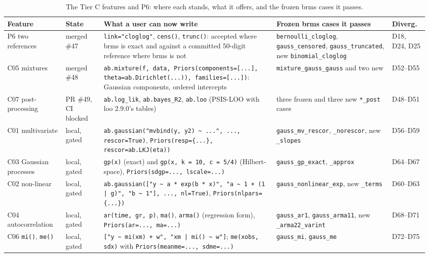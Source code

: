 \documentclass[11pt]{article}
\newcommand{\code}[1]{\texttt{#1}}
\begin{document}
\begin{table}[tbp]
\small
\begin{center}\begin{tabular}{@{}>{\raggedright\arraybackslash}p{}>{\raggedright\arraybackslash}p{}>{\raggedright\arraybackslash}p{}>{\raggedright\arraybackslash}p{}>{\raggedright\arraybackslash}p{}@{}}
\toprule
Feature & State & What a user can now write & Frozen brms cases it passes & Diverg. \\
\midrule
P6 two references & merged \#47 & \code{link="cloglog"}, \code{cens()}, \code{trunc()}: accepted where brms is exact and against a committed 50-digit reference where brms is not & \code{bernoulli\_\allowbreak{}cloglog}, \code{gauss\_\allowbreak{}censored}, \code{gauss\_\allowbreak{}truncated}, new \code{binomial\_\allowbreak{}cloglog} & D18, D24, D25 \\
C05 mixtures & merged \#48 & \code{ab.mixture(f, data, Priors(components=[...], theta=ab.Dirichlet(...)), families=[...])}: Gaussian components, ordered intercepts & \code{mixture\_\allowbreak{}gauss\_\allowbreak{}gauss} and two new & D52--D55 \\
C07 post-processing & PR \#49, CI blocked & \code{ab.log\_lik}, \code{ab.bayes\_R2}, \code{ab.loo} (PSIS-LOO with loo 2.9.0's tables) & three frozen and three new \code{*\_post} cases & D48--D51 \\
C01 multivariate & local, gated & \code{ab.gaussian("mvbind(y, y2) \textasciitilde{} ...", ..., rescor=True)}, \code{Priors(resp=\{...\}, rescor=ab.LKJ(eta))} & \code{gauss\_\allowbreak{}mv\_\allowbreak{}rescor}, \code{\_norescor}, new \code{\_slopes} & D56--D59 \\
C03 Gaussian processes & local, gated & \code{gp(x)} (exact) and \code{gp(x, k = 10, c = 5/4)} (Hilbert-space), \code{Priors(sdgp=..., lscale=...)} & \code{gauss\_\allowbreak{}gp\_\allowbreak{}exact}, \code{\_approx} & D64--D67 \\
C02 non-linear & local, gated & \code{ab.gaussian(["y \textasciitilde{} a * exp(b * x)", "a \textasciitilde{} 1 + (1 | g)", "b \textasciitilde{} 1"], ..., nl=True)}, \code{Priors(nlpars=\{...\})} & \code{gauss\_\allowbreak{}nonlinear\_\allowbreak{}exp}, new \code{\_terms} & D60--D63 \\
C04 autocorrelation & local, gated & \code{ar(time, gr, p)}, \code{ma()}, \code{arma()} (regression form), \code{Priors(ar=..., ma=...)} & \code{gauss\_\allowbreak{}ar1}, \code{gauss\_\allowbreak{}arma11}, new \code{\_arma22\_varint} & D68--D71 \\
C06 \code{mi()}, \code{me()} & local, gated & \code{["y \textasciitilde{} mi(xm) + w", "xm | mi() \textasciitilde{} w"]}; \code{me(xobs, sdx)} with \code{Priors(meanme=..., sdme=...)} & \code{gauss\_\allowbreak{}mi}, \code{gauss\_\allowbreak{}me} & D72--D75 \\
\bottomrule
\end{tabular}\end{center}
\caption{\small The Tier C features and P6: where each stands, what it offers, and the frozen brms cases it passes.}\label{tab:built}
\end{table}
\end{document}

